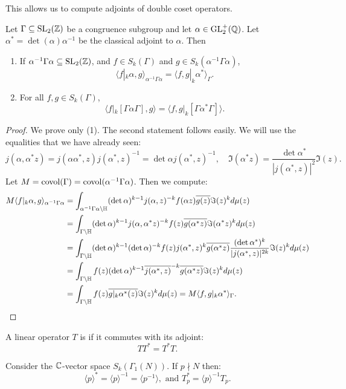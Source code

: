 This allows us to compute adjoints of double coset operators.
\begin{proposition}
\label{prop:adjoints-double-cosets}
  Let $\Gamma\subseteq \operatorname{SL}_2(\mathbb{Z})$ be a congruence subgroup and let $\alpha\in\operatorname{GL}_2^+(\mathbb{Q})$. Let $\alpha^*=\det(\alpha)\alpha^{-1}$ be the classical adjoint to $\alpha$. Then
  \begin{enumerate}
  \item If $\alpha^{-1}\Gamma\alpha\subseteq \operatorname{SL}_2(\mathbb{Z})$, and $f\in S_k(\Gamma)$ and $g\in S_k(\alpha^{-1}\Gamma\alpha)$,
\[
\langle f|_k\alpha,g\rangle_{\alpha^{-1}\Gamma\alpha}=\langle f,g|_k\alpha^*\rangle_\Gamma.
\]
\item For all $f,g\in S_k(\Gamma)$,
\[
\langle f|_k[\Gamma\alpha\Gamma],g\rangle = \langle f,g|_k[\Gamma\alpha^*\Gamma]\rangle.
\]
  \end{enumerate}
\end{proposition}
\begin{proof}
We prove only (1). The second statement follows easily. We will use the equalities that we have already seen:
\[
j(\alpha,\alpha^*z) = j(\alpha\alpha^*,z)j(\alpha^*,z)^{-1} = \det \alpha j(\alpha^*,z)^{-1},\quad \Im(\alpha^*z) = \frac{\det\alpha^*}{|j(\alpha^*,z)|^2} \Im(z).
\]
Let $M=\operatorname{covol}(\Gamma)=\operatorname{covol}(\alpha^{-1}\Gamma\alpha)$. Then we compute:
\begin{align*}
M\langle f|_k\alpha,g\rangle_{\alpha^{-1}\Gamma\alpha} &=  \int_{\alpha^{-1}\Gamma\alpha\backslash\mathbb{H}} (\operatorname{det}\alpha)^{k-1}j(\alpha,z)^{-k}f(\alpha z) \overline{g(z)} \Im(z)^k d\mu(z)\\
&= \int_{\Gamma\backslash\mathbb{H}} (\operatorname{det}\alpha)^{k-1}j(\alpha,\alpha^*z)^{-k} f(z)\overline{g(\alpha^*z)}\Im(\alpha^*z)^kd\mu(z)\\
&=\int_{\Gamma\backslash \mathbb{H}} (\operatorname{det}\alpha)^{k-1}(\operatorname{det}\alpha)^{-k}f(z)j(\alpha^*,z)^k\overline{g(\alpha^*z)} \frac{(\operatorname{det}\alpha^*)^k}{|j(\alpha^*,z)|^{2k}}\Im(z)^kd\mu(z)\\
&=\int_{\Gamma\backslash\mathbb{H}} f(z)(\operatorname{det} \alpha)^{k-1} \overline{j(\alpha^*,z)}^{-k} \overline{g(\alpha^*z)} \Im(z)^kd\mu(z)\\
&=\int_{\Gamma\backslash\mathbb{H}} f(z)\overline{g|_k\alpha^*(z)} \Im(z)^kd\mu(z) = M\langle f,g|_k\alpha^*\rangle_\Gamma.
\end{align*}
\end{proof}
\begin{definition}
  A linear operator $T$ is  if it commutes with its adjoint:
\[ T T^* = T^* T.\]
\end{definition}
\begin{theorem}
  Consider the $\mathbb{C}$-vector space $S_k(\Gamma_1(N))$. If $p\nmid N$ then:
\[
\langle p\rangle^* = \langle p\rangle^{-1} = \langle p^{-1}\rangle,\text{ and } T_p^* = \langle p\rangle^{-1} T_p.
\]
\end{theorem}
